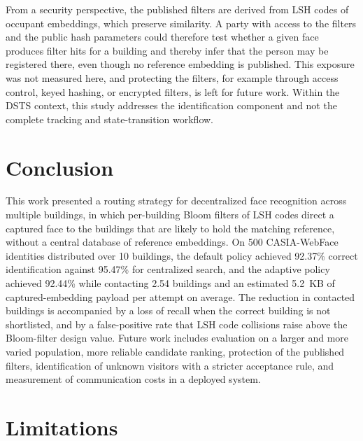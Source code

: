 \documentclass[pdflatex,sn-mathphys-num]{sn-jnl}%
\theoremstyle{thmstyleone}%
\theoremstyle{thmstyletwo}%
\theoremstyle{thmstylethree}%
\begin{document}
From a security perspective, the published filters are derived from LSH codes of occupant embeddings, which preserve similarity. A party with access to the filters and the public hash parameters could therefore test whether a given face produces filter hits for a building and thereby infer that the person may be registered there, even though no reference embedding is published. This exposure was not measured here, and protecting the filters, for example through access control, keyed hashing, or encrypted filters, is left for future work. Within the DSTS context, this study addresses the identification component and not the complete tracking and state-transition workflow.


\section{Conclusion}
\label{sec:conclusion}

This work presented a routing strategy for decentralized face recognition across multiple buildings, in which per-building Bloom filters of LSH codes direct a captured face to the buildings that are likely to hold the matching reference, without a central database of reference embeddings. On 500 CASIA-WebFace identities distributed over 10 buildings, the default policy achieved 92.37\% correct identification against 95.47\% for centralized search, and the adaptive policy achieved 92.44\% while contacting 2.54 buildings and an estimated 5.2~KB of captured-embedding payload per attempt on average. The reduction in contacted buildings is accompanied by a loss of recall when the correct building is not shortlisted, and by a false-positive rate that LSH code collisions raise above the Bloom-filter design value. Future work includes evaluation on a larger and more varied population, more reliable candidate ranking, protection of the published filters, identification of unknown visitors with a stricter acceptance rule, and measurement of communication costs in a deployed system.


\section{Limitations}
\label{sec:limitations}
\end{document}
